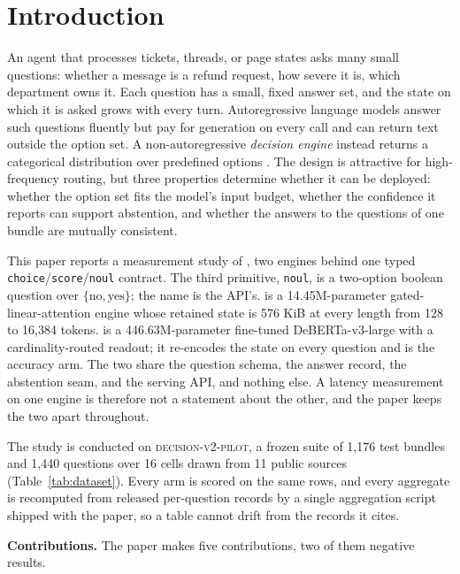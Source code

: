 \section{Introduction}
\label{sec:intro}

An agent that processes tickets, threads, or page states asks many small questions: whether a
message is a refund request, how severe it is, which department owns it. Each question has a
small, fixed answer set, and the state on which it is asked grows with every turn.
Autoregressive language models answer such questions fluently but pay for generation on every
call and can return text outside the option set. A non-autoregressive \emph{decision engine}
instead returns a categorical distribution over predefined options
\cite{li2026jev,duan2026gdm}. The design is attractive for high-frequency routing, but three
properties determine whether it can be deployed: whether the option set fits the model's input
budget, whether the confidence it reports can support abstention, and whether the answers to the
questions of one bundle are mutually consistent.

This paper reports a measurement study of \myna, two engines behind one typed
\texttt{choice}/\texttt{score}/\texttt{noul} contract. The third primitive, \texttt{noul}, is a two-option boolean question over $\{\text{no},\text{yes}\}$; the name is the API's. \stream{} is a 14.45M-parameter
gated-linear-attention engine whose retained state is 576 KiB at every length from 128 to
16{,}384 tokens. \vsix{} is a 446.63M-parameter fine-tuned DeBERTa-v3-large with a
cardinality-routed readout; it re-encodes the state on every question and is the accuracy arm.
The two share the question schema, the answer record, the abstention seam, and the serving API,
and nothing else. A latency measurement on one engine is therefore not a statement about the
other, and the paper keeps the two apart throughout.

The study is conducted on \textsc{decision-v2-pilot}, a frozen suite of 1{,}176 test bundles and
1{,}440 questions over 16 cells drawn from 11 public sources (Table~\ref{tab:dataset}). Every arm
is scored on the same rows, and every aggregate is recomputed from released per-question records
by a single aggregation script shipped with the paper, so a table cannot drift from the records
it cites.

\textbf{Contributions.} The paper makes five contributions, two of them negative results.

